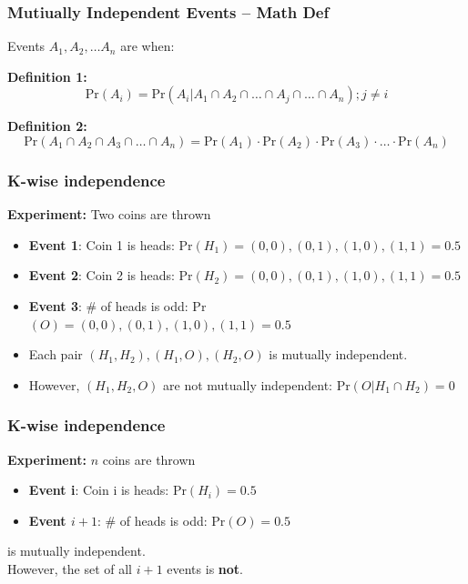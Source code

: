 \documentclass{beamer}
\begin{document}
\begin{frame}
  \frametitle{Mutiually Independent Events -- Math Def}

  Events $A_1, A_2, \ldots A_n$ are  when:

  \vfill
  
  {\bf Definition 1:}
  \begin{equation}
    \text{Pr}(A_i) = \text{Pr}(A_i|A_1 \cap A_2 \cap \ldots \cap A_j \cap  \ldots \cap A_n); j \neq i
  \end{equation}

  \bigskip
  
  {\bf Definition 2:}
  \begin{equation}
    \text{Pr}(A_1 \cap A_2 \cap A_3 \cap \ldots \cap A_n) = \text{Pr}(A_1)\cdot\text{Pr}(A_2)\cdot\text{Pr}(A_3)\cdot\ldots\cdot\text{Pr}(A_n) 
  \end{equation}
\end{frame}

\begin{frame}
  \frametitle{K-wise independence}

  {\bf Experiment:} Two coins are thrown
  \begin{itemize}
  \item {\bf Event 1}: Coin 1 is heads: Pr$(H_1) = (0,0),(0,1),(1,0),(1,1) = 0.5$
  \item {\bf Event 2}: Coin 2 is heads: Pr$(H_2) = (0,0),(0,1),(1,0),(1,1) = 0.5$
  \item {\bf Event 3}: \# of heads is odd: Pr$(O) = (0,0),(0,1),(1,0),(1,1) = 0.5$
  \end{itemize}

  \vfill
  
  \begin{itemize}
  \item Each pair $(H_1, H_2),(H_1,O),(H_2,O)$ is mutually independent.
  \item However, $(H_1, H_2, O)$ are not mutually independent:
    Pr$(O|H_1\cap H_2) = 0$
  \end{itemize}
\end{frame}

\begin{frame}
  \frametitle{K-wise independence}
  {\larger
  {\bf Experiment:} $n$ coins are thrown
  \begin{itemize}
  \item {\bf Event i}: Coin i is heads: Pr$(H_i) = 0.5$
  \item {\bf Event $i+1$}: \# of heads is odd: Pr$(O) = 0.5$
  \end{itemize}

  \vfill
  
   is mutually independent.\\
  However, \alert{the set of all $i+1$} events is {\bf not}.
  }  
\end{frame}
\end{document}
